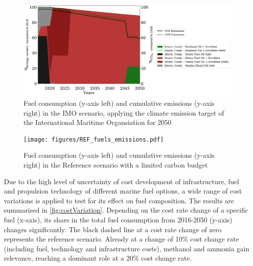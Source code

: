 \documentclass[article]{elsarticle}
\begin{document}
\begin{figure}[htb]
    \centering
    \includegraphics[width=\textwidth]{figures/IMO_fuels_emissions.pdf}
    \caption{Fuel consumption (y-axis left) and cumulative emissions (y-axis right) in the IMO scenario, applying the climate emission target of the International Maritime Organsiation for 2050}
    \label{fig:IMO}
\end{figure}

\begin{figure}[htb]
    \centering
    \texttt{[image: figures/REF\_fuels\_emissions.pdf]}
    \caption{Fuel consumption (y-axis left) and cumulative emissions (y-axis right) in the Reference scenario with a limited carbon budget}
    \label{fig:REF}
\end{figure}



Due to the high level of uncertainty of cost development of infrastructure, fuel and propulsion technology of different marine fuel options, a wide range of cost variations is applied to test for its effect on fuel composition. The results are summarised in \autoref{fig:costVariation}. Depending on the cost rate change of a specific fuel (x-axis), its share in the total fuel consumption from 2016-2050 (y-axis) changes significantly. The black dashed line at a cost rate change of zero represents the reference scenario. Already at a change of 10\% cost change rate (including fuel, technology and infrastructure costs), methanol and ammonia gain relevance, reaching a dominant role at a 20\% cost change rate.
\end{document}
